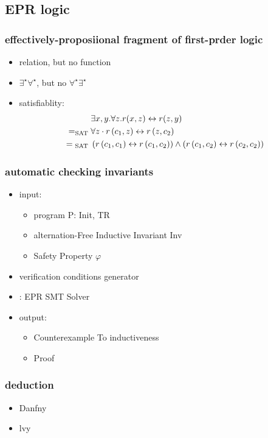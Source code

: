 \subsection{EPR logic}
\begin{frame}
    \frametitle{effectively-proposiional fragment of first-prder logic}
    \begin{itemize}
        \item relation, but no function
        \item $\exists^{\star} \forall ^{\star}$, but no $\forall^{\star} \exists ^{\star}$
        \item satisfiablity:
        \begin{align}
            &\exists x, y . \forall z . r(x, z) \leftrightarrow r(z, y) \notag\\
            = _{\text {SAT }}& \forall z \cdot r\left(c_{1}, z\right) \leftrightarrow r\left(z, c_{2}\right) \notag\\
            = { }_{\text {SAT }}&\left(r\left(c_{1}, c_{1}\right) \leftrightarrow r\left(c_{1}, c_{2}\right)\right) \wedge\left(r\left(c_{1}, c_{2}\right) \leftrightarrow r\left(c_{2}, c_{2}\right)\right)
        \end{align}
    \end{itemize}
\end{frame}
\begin{frame}
    \frametitle{automatic checking invariants}
    \begin{itemize}
        \item input:
        \begin{itemize}
            \item program P: Init, TR
            \item alternation-Free Inductive Invariant Inv
            \item Safety Property $\varphi$
        \end{itemize}
        \item verification conditions generator
        \item: EPR SMT Solver
        \item output:
        \begin{itemize}
            \item Counterexample To inductiveness
            \item Proof
        \end{itemize}
    \end{itemize}
\end{frame}
\begin{frame}
    \frametitle{deduction}
    \begin{itemize}
        \item Danfny
        \item lvy
    \end{itemize}
\end{frame}